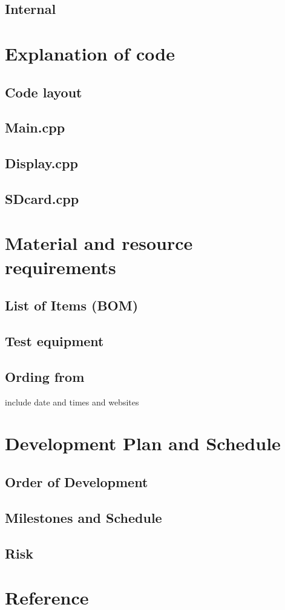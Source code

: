 \documentclass[11pt]{article}
\begin{document}
\subsection{Internal}

\section{Explanation of code}
\subsection{Code layout}
\subsection{Main.cpp}
\subsection{Display.cpp}
\subsection{SDcard.cpp}


\section{Material and resource requirements}
\subsection{List of Items (BOM)}
\subsection{Test equipment}
\subsection{Ording from}
include date and times and websites

\section{Development Plan and Schedule}
\subsection{Order of Development}
\subsection{Milestones and Schedule}
\subsection{Risk}

\section{Reference}
\end{document}
